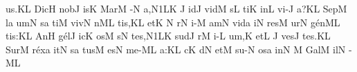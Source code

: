 \sgn {}u{s.}\punctum K\augmentum L\egn
\spatium
\divisiofinalis
\spatium
\sgn Dic\punctum H\egn
\spatium
\sgn n{o}b\punctum J\egn
\sgn {}is\punctum K\egn
\spatium
\sgn Mar\punctum M\egn
\sgn {}{\'\i}-\punctum N\egn
\sgn {}a,\episem N1\clivis LK\egn
\spatium
\divisiominima
\spatium
{}\Internote
\custos J
\lineaproxima
{}id\punctum J\egn
\spatium
\sgn vid\punctum M\egn
\sgn {}{\'\i}s\punctum L\egn
\sgn ti{}\punctum K\egn
\spatium
\sgn {}in\punctum L\egn
\spatium
\sgn v{i}-\punctum J\egn
\sgn {}a?\punctum K\augmentum L\egn
\spatium
\divisiofinalis
\spatium
\sgn Sep\punctum M\egn
{}l\punctum a\egn
{}um\punctum N\egn
\spatium
{}s\punctum a\egn
\sgn ti{}\punctum M\egn
\spatium
\sgn viv\punctum N\egn
{}n\cephalicus ML\egn
\sgn ti{s,}\punctum K\augmentum L\egn
\spatium
\divisiominor
\spatium
\sgn {}et\punctum K\egn
\spatium
\custos N
\Internote
{}
\lineaproxima
{}r\punctum N\egn
\sgn {}i-\punctum M\egn
\sgn {}am\punctum N\egn
\spatium
\sgn v{i}d\punctum a\egn
\sgn {}i{}\punctum N\egn
\spatium
\sgn res\punctum M\egn
\sgn {}ur\punctum N\egn
\sgn g{\'e}n\cephalicus ML\egn
\sgn ti{s:}\punctum K\augmentum L\egn
\spatium
\divisiofinalis
\spatium
\sgn {}An\punctum H\egn
\sgn g{\'e}l\punctum J\egn
\sgn {}ic\punctum K\egn
\sgn {}os\punctum M\egn
\spatium
{}s\punctum N\egn
\sgn te{s,}\episem N1\clivis LK\egn
\spatium
\divisiominima
\spatium
\sgn sud\punctum J\egn
{}r\punctum M\egn
\sgn {}i-\punctum L\egn
\sgn {}u{m,}\punctum K\egn
\spatium
\sgn {}et\punctum L\egn
\spatium
\custos J
\Internote
{}
\lineaproxima
\sgn v{e}s\punctum J\egn
\sgn te{s.}\punctum K\augmentum L\egn
\spatium
\divisiofinalis
\spatium
\sgn Sur\punctum M\egn
\sgn r{\'e}x\punctum a\egn
\sgn {}it\punctum N\egn
\spatium
{}s\punctum a\egn
\sgn tus\punctum M\egn
\spatium
{}es\punctum N\egn
\spatium
\sgn m{e}-\clivis ML\egn
\sgn {}a:\punctum K\augmentum L\egn
\spatium
\divisiominor
\spatium
{}c\punctum K\egn
{}d\punctum N\egn
\sgn {}et\punctum M\egn
\spatium
\sgn s{u}-\punctum N\egn
\sgn {}os\punctum a\egn
\spatium
\sgn {}in\punctum N\egn
\spatium
\custos M
\lineaproxima
\sgn Gal\punctum M\egn
\sgn {}il\punctum N\egn
\sgn {}{\'\ae}-\clivis ML\egn
